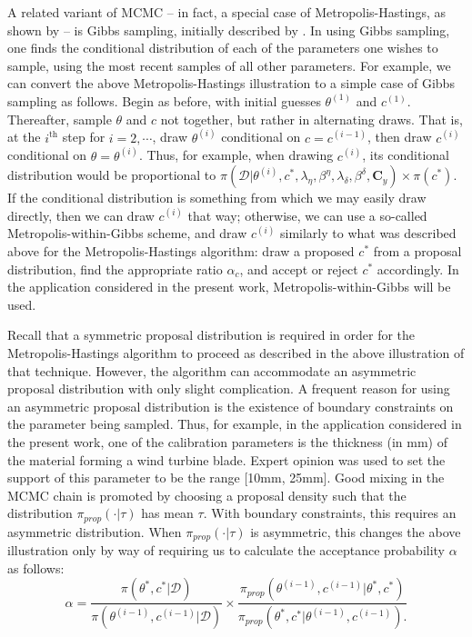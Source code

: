 \documentclass{article}
\begin{document}
A related variant of MCMC -- in fact, a special case of Metropolis-Hastings, as shown by \cite{Gelman1992} -- is Gibbs sampling, initially described by \cite{Geman1984}. In using Gibbs sampling, one finds the conditional distribution of each of the parameters one wishes to sample, using the most recent samples of all other parameters. For example, we can convert the above Metropolis-Hastings illustration to a simple case of Gibbs sampling as follows.
Begin as before, with initial guesses $\theta^{(1)}$ and $c^{(1)}$. Thereafter, sample $\theta$ and $c$ not together, but rather in alternating draws. That is, at the $i^{\text{th} }$ step for $i=2,\cdots$, draw $\theta^{(i)}$ conditional on $c=c^{(i-1)}$, then draw $c^{(i)}$ conditional on $\theta=\theta^{(i)}$. Thus, for example, when drawing $c^{(i)}$, its conditional distribution would be proportional to $\pi(\mathcal D | \theta^{(i)},c^{*},\lambda_\eta, \beta^\eta,\lambda_\delta,\beta^\delta,\mathbf C_y) \times \pi(c^{*})$. 
If the conditional distribution is something from which we may easily draw directly, then we can draw $c^{(i)}$ that way; otherwise, we can use a so-called Metropolis-within-Gibbs scheme, and draw $c^{(i)}$ similarly to what was described above for the Metropolis-Hastings algorithm: draw a proposed $c^*$ from a proposal distribution, find the appropriate ratio $\alpha_c$, and accept or reject $c^*$ accordingly. In the application considered in the present work, Metropolis-within-Gibbs will be used.


Recall that a symmetric proposal distribution is required in order for the Metropolis-Hastings algorithm to proceed as described in the above illustration of that technique. However, the algorithm can accommodate an asymmetric proposal distribution with only slight complication. A frequent reason for using an asymmetric proposal distribution is the existence of boundary constraints on the parameter being sampled. Thus, for example, in the application considered in the present work, one of the calibration parameters is the thickness (in mm) of the material forming a wind turbine blade. Expert opinion was used to set the support of this parameter to be the range [10mm, 25mm]. Good mixing in the MCMC chain is promoted by choosing a proposal density such that the distribution $\pi_{prop}(\cdot|\tau)$ has mean $\tau$. With boundary constraints, this requires an asymmetric distribution. When $\pi_{prop}(\cdot|\tau)$ is asymmetric, this changes the above illustration only by way of requiring us to calculate the acceptance probability $\alpha$ as follows:
\begin{equation}\label{eq:mh-correction}
\alpha = \frac{\pi(\theta^*,c^* | \mathcal D)}{ \pi(\theta^{(i-1)},c^{(i-1)}|\mathcal D) } \times 
\frac{
\pi_{prop}(\theta^{(i-1)},c^{(i-1)}|\theta^*,c^*)
}{
\pi_{prop}(\theta^*,c^*|\theta^{(i-1)},c^{(i-1)}).
}
\end{equation}
\end{document}
